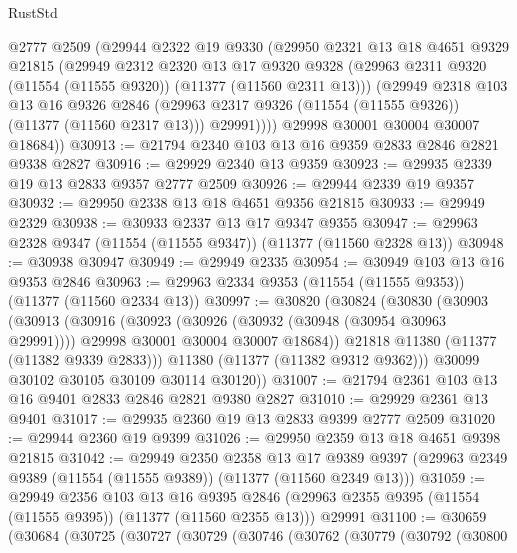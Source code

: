 \begin{lexlean}{RustStd}
\begin{coremodule}
        @2777
        @2509
        (@29944
          @2322
          @19
          @9330
          (@29950
            @2321
            @13
            @18
            @4651
            @9329
            @21815
            (@29949
              @2312
              @2320
              @13
              @17
              @9320
              @9328
              (@29963 @2311 @9320 (@11554 (@11555 @9320)) (@11377 (@11560 @2311 @13)))
              (@29949
                @2318
                @103
                @13
                @16
                @9326
                @2846
                (@29963 @2317 @9326 (@11554 (@11555 @9326)) (@11377 (@11560 @2317 @13)))
                @29991))))
        @29998
        @30001
        @30004
        @30007
        @18684))
@30913 := @21794 @2340 @103 @13 @16 @9359 @2833 @2846 @2821 @9338 @2827
@30916 := @29929 @2340 @13 @9359
@30923 := @29935 @2339 @19 @13 @2833 @9357 @2777 @2509
@30926 := @29944 @2339 @19 @9357
@30932 := @29950 @2338 @13 @18 @4651 @9356 @21815
@30933 := @29949 @2329
@30938 := @30933 @2337 @13 @17 @9347 @9355
@30947 := @29963 @2328 @9347 (@11554 (@11555 @9347)) (@11377 (@11560 @2328 @13))
@30948 := @30938 @30947
@30949 := @29949 @2335
@30954 := @30949 @103 @13 @16 @9353 @2846
@30963 := @29963 @2334 @9353 (@11554 (@11555 @9353)) (@11377 (@11560 @2334 @13))
@30997 := @30820
    (@30824
      (@30830
        (@30903
          (@30913
            (@30916
              (@30923
                (@30926 (@30932 (@30948 (@30954 @30963 @29991))))
                @29998
                @30001
                @30004
                @30007
                @18684))
            @21818
            @11380
            (@11377 (@11382 @9339 @2833)))
          @11380
          (@11377 (@11382 @9312 @9362)))
        @30099
        @30102
        @30105
        @30109
        @30114
        @30120))
@31007 := @21794 @2361 @103 @13 @16 @9401 @2833 @2846 @2821 @9380 @2827
@31010 := @29929 @2361 @13 @9401
@31017 := @29935 @2360 @19 @13 @2833 @9399 @2777 @2509
@31020 := @29944 @2360 @19 @9399
@31026 := @29950 @2359 @13 @18 @4651 @9398 @21815
@31042 := @29949
    @2350
    @2358
    @13
    @17
    @9389
    @9397
    (@29963 @2349 @9389 (@11554 (@11555 @9389)) (@11377 (@11560 @2349 @13)))
@31059 := @29949
    @2356
    @103
    @13
    @16
    @9395
    @2846
    (@29963 @2355 @9395 (@11554 (@11555 @9395)) (@11377 (@11560 @2355 @13)))
    @29991
@31100 := @30659
    (@30684
      (@30725
        (@30727
          (@30729
            (@30746
              (@30762
                (@30779
                  (@30792
                    (@30800

\end{coremodule}
\end{lexlean}

